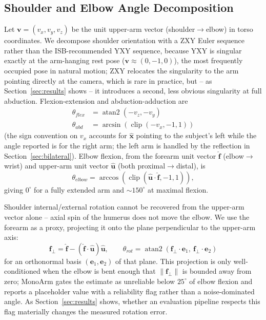 \documentclass[conference]{IEEEtran}
\begin{document}
\subsection{Shoulder and Elbow Angle Decomposition}
\label{sec:angles}
Let $\mathbf{v} = (v_x, v_y, v_z)$ be the unit upper-arm vector
(shoulder$\to$elbow) in torso coordinates. We decompose shoulder
orientation with a ZXY Euler sequence rather than the ISB-recommended
YXY sequence, because YXY is singular exactly at the arm-hanging rest
pose ($\mathbf{v}\approx(0,-1,0)$), the most frequently occupied pose in
natural motion; ZXY relocates the singularity to the arm pointing
directly at the camera, which is rare in practice, but -- as
Section~\ref{sec:results} shows -- it introduces a second, less obvious
singularity at full abduction. Flexion-extension and
abduction-adduction are
\begin{align}
\theta_{flex} &= \operatorname{atan2}(-v_z, -v_y) \\
\theta_{abd} &= \arcsin(\operatorname{clip}(-v_x, -1, 1))
\end{align}
(the sign convention on $v_x$ accounts for $\hat{\mathbf{x}}$ pointing to
the subject's left while the angle reported is for the right arm; the
left arm is handled by the reflection in Section~\ref{sec:bilateral}).
Elbow flexion, from the forearm unit vector $\hat{\mathbf{f}}$
(elbow$\to$wrist) and upper-arm unit vector $\hat{\mathbf{u}}$ (both
proximal$\to$distal), is
\begin{equation}
\theta_{elbow} = \arccos(\operatorname{clip}(\hat{\mathbf{u}}\cdot\hat{\mathbf{f}}, -1, 1)),
\end{equation}
giving $0^\circ$ for a fully extended arm and $\sim\!150^\circ$ at
maximal flexion.

Shoulder internal/external rotation cannot be recovered from the
upper-arm vector alone -- axial spin of the humerus does not move the
elbow. We use the forearm as a proxy, projecting it onto the plane
perpendicular to the upper-arm axis:
\begin{equation}
\mathbf{f}_\perp = \hat{\mathbf{f}} - (\hat{\mathbf{f}}\cdot\hat{\mathbf{u}})\hat{\mathbf{u}}, \qquad
\theta_{rot} = \operatorname{atan2}(\mathbf{f}_\perp\!\cdot\!\mathbf{e}_1,\ \mathbf{f}_\perp\!\cdot\!\mathbf{e}_2)
\end{equation}
for an orthonormal basis $(\mathbf{e}_1, \mathbf{e}_2)$ of that plane.
This projection is only well-conditioned when the elbow is bent enough
that $\|\mathbf{f}_\perp\|$ is bounded away from zero; MonoArm gates the
estimate as unreliable below $25^\circ$ of elbow flexion and reports a
placeholder value with a reliability flag rather than a noise-dominated
angle. As Section~\ref{sec:results} shows, whether an evaluation
pipeline respects this flag materially changes the measured rotation
error.
\end{document}

